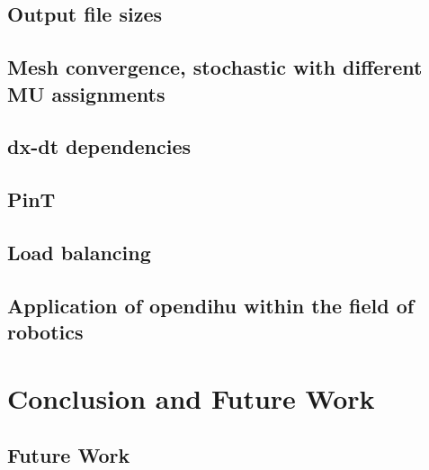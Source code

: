 \section{Output file sizes}
\section{Mesh convergence, stochastic with different MU assignments}
\section{dx-dt dependencies}
\section{PinT}
\section{Load balancing}
\section{Application of opendihu within the field of robotics}

\chapter{Conclusion and Future Work}\label{sec:conclusion_and_future_work}

\section{Future Work}\label{sec:future_work}
 






